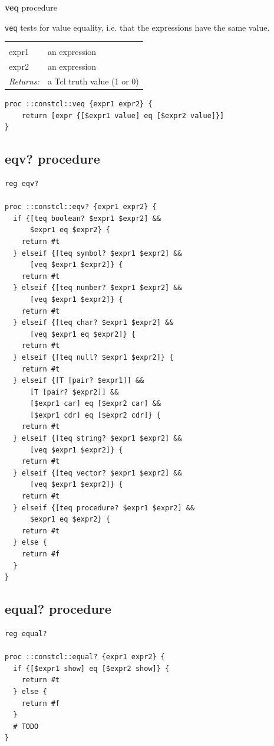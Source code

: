 \documentclass[twoside,9pt]{report}
\begin{document}
\textbf{veq} procedure


\texttt{veq} tests for value equality, i.e. that the expressions have the same value.

\noindent\begin{tabular}{ |p{1.9cm} p{8cm}| }
\hline
\rowcolor[HTML]{CCCCCC} \multicolumn{2}{|l|}{\bf veq (internal)} \\
expr1 & an expression \\
expr2 & an expression \\
\textit{Returns:} & a Tcl truth value (1 or 0) \\
\hline
\end{tabular}
\begin{lstlisting}
proc ::constcl::veq {expr1 expr2} {
    return [expr {[$expr1 value] eq [$expr2 value]}]
}
\end{lstlisting}
\subsection{eqv? procedure}
\label{eqv?-procedure}
\begin{lstlisting}
reg eqv?

proc ::constcl::eqv? {expr1 expr2} {
  if {[teq boolean? $expr1 $expr2] &&
      $expr1 eq $expr2} {
    return #t
  } elseif {[teq symbol? $expr1 $expr2] &&
      [veq $expr1 $expr2]} {
    return #t
  } elseif {[teq number? $expr1 $expr2] &&
      [veq $expr1 $expr2]} {
    return #t
  } elseif {[teq char? $expr1 $expr2] &&
      [veq $expr1 eq $expr2]} {
    return #t
  } elseif {[teq null? $expr1 $expr2]} {
    return #t
  } elseif {[T [pair? $expr1]] &&
      [T [pair? $expr2]] &&
      [$expr1 car] eq [$expr2 car] &&
      [$expr1 cdr] eq [$expr2 cdr]} {
    return #t
  } elseif {[teq string? $expr1 $expr2] &&
      [veq $expr1 $expr2]} {
    return #t
  } elseif {[teq vector? $expr1 $expr2] &&
      [veq $expr1 $expr2]} {
    return #t
  } elseif {[teq procedure? $expr1 $expr2] &&
      $expr1 eq $expr2} {
    return #t
  } else {
    return #f
  }
}
\end{lstlisting}
\subsection{equal? procedure}
\label{equal?-procedure}
\begin{lstlisting}
reg equal?

proc ::constcl::equal? {expr1 expr2} {
  if {[$expr1 show] eq [$expr2 show]} {
    return #t
  } else {
    return #f
  }
  # TODO
}
\end{lstlisting}
\end{document}
